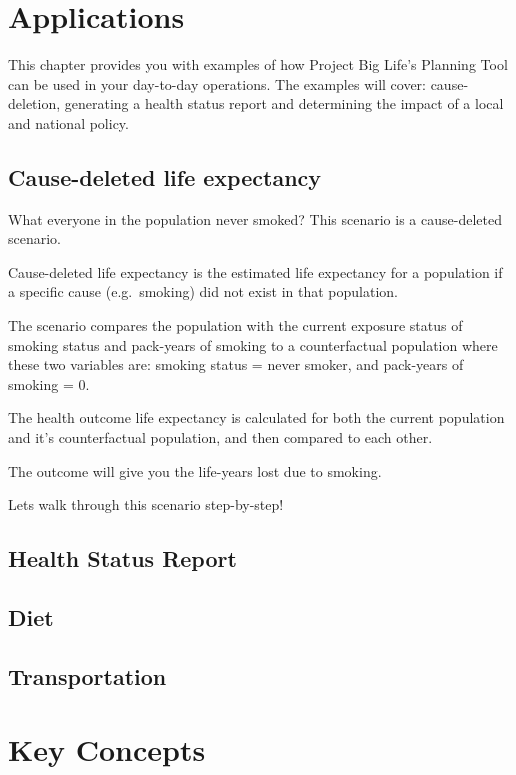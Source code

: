 \documentclass[]{book}
\begin{document}
\chapter{Applications}\label{applications}

This chapter provides you with examples of how Project Big Life's
Planning Tool can be used in your day-to-day operations. The examples
will cover: cause-deletion, generating a health status report and
determining the impact of a local and national policy.

\section{Cause-deleted life
expectancy}\label{cause-deleted-life-expectancy}

What everyone in the population never smoked? This scenario is a
cause-deleted scenario.

Cause-deleted life expectancy is the estimated life
expectancy for a population if a specific cause (e.g.~smoking) did not
exist in that population.

The scenario compares the population with the current exposure status of
smoking status and pack-years of smoking to a counterfactual population
where these two variables are: smoking status = never smoker, and
pack-years of smoking = 0.

The health outcome life expectancy is calculated for both the current
population and it's counterfactual population, and then compared to each
other.

The outcome will give you the life-years lost due to smoking.

Lets walk through this scenario step-by-step!

\section{Health Status Report}\label{health-status-report}

\section{Diet}\label{diet}

\section{Transportation}\label{transportation}

\chapter{Key Concepts}\label{keyconcepts}
\end{document}
